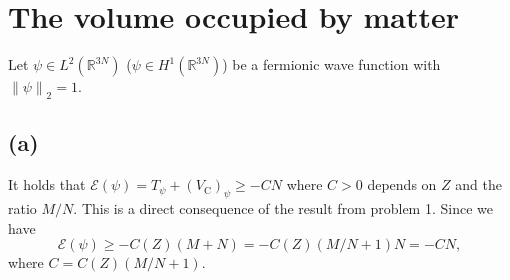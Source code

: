 \documentclass[a4paper,11pt]{article}
\newcommand{\norm}[1]{\left\lVert #1 \right\rVert}
\newcommand{\R}{\mathbb{R}}
\numberwithin{equation}{section}
\begin{document}
 \section{The volume occupied by matter}
 Let $ \psi\in L^2(\R^{3N}) $ ($ \psi\in H^1(\R^{3N}) $) be a fermionic wave function  with $ \norm{\psi}_2=1 $.
 \subsection*{(a)}
 It holds that $ \mathcal{E}(\psi)=T_\psi+(V_\text{C})_\psi\geq-CN $ where $ C>0 $ depends on $ Z $ and the ratio $ M/N $. This is a direct consequence of the result from problem 1. Since we have \begin{equation}
 \mathcal{E}(\psi)\geq -C(Z)(M+N)=-C(Z)(M/N+1)N=-CN,
 \end{equation}
 where $ C=C(Z)(M/N+1)$.
\end{document}
